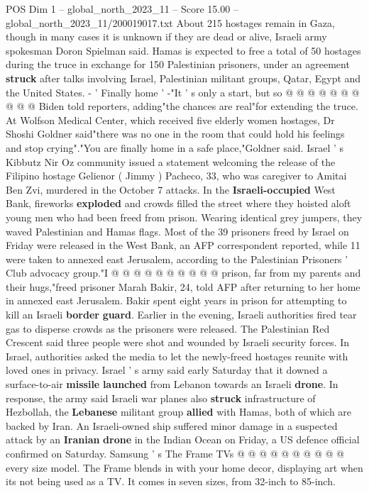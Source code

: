 \begin{textsample}{POS Dim 1 – global\_north\_2023\_11 – Score 15.00 – global\_north\_2023\_11/200019017.txt}
About 215 hostages remain in Gaza, though in many cases it is unknown if they are dead or alive, Israeli army spokesman Doron Spielman said.
Hamas is expected to free a total of 50 hostages during the truce in exchange for 150 Palestinian prisoners, under an agreement \textbf{struck} after talks involving Israel, Palestinian militant groups, Qatar, Egypt and the United States. - ' Finally home ' -"It ' s only a start, but so @ @ @ @ @ @ @ @ @ @ Biden told reporters, adding"the chances are real"for extending the truce.
At Wolfson Medical Center, which received five elderly women hostages, Dr Shoshi Goldner said"there was no one in the room that could hold his feelings and stop crying"."You are finally home in a safe place,"Goldner said.
Israel ' s Kibbutz Nir Oz community issued a statement welcoming the release of the Filipino hostage Gelienor ( Jimmy ) Pacheco, 33, who was caregiver to Amitai Ben Zvi, murdered in the October 7 attacks.
In the \textbf{Israeli-occupied} West Bank, fireworks \textbf{exploded} and crowds filled the street where they hoisted aloft young men who had been freed from prison.
Wearing identical grey jumpers, they waved Palestinian and Hamas flags.
Most of the 39 prisoners freed by Israel on Friday were released in the West Bank, an AFP correspondent reported, while 11 were taken to annexed east Jerusalem, according to the Palestinian Prisoners ' Club advocacy group."I @ @ @ @ @ @ @ @ @ @ prison, far from my parents and their hugs,"freed prisoner Marah Bakir, 24, told AFP after returning to her home in annexed east Jerusalem.
Bakir spent eight years in prison for attempting to kill an Israeli \textbf{border} \textbf{guard}.
Earlier in the evening, Israeli authorities fired tear gas to disperse crowds as the prisoners were released.
The Palestinian Red Crescent said three people were shot and wounded by Israeli security forces.
In Israel, authorities asked the media to let the newly-freed hostages reunite with loved ones in privacy.
Israel ' s army said early Saturday that it downed a surface-to-air \textbf{missile} \textbf{launched} from Lebanon towards an Israeli \textbf{drone}.
In response, the army said Israeli war planes also \textbf{struck} infrastructure of Hezbollah, the \textbf{Lebanese} militant group \textbf{allied} with Hamas, both of which are backed by Iran.
An Israeli-owned ship suffered minor damage in a suspected attack by an \textbf{Iranian} \textbf{drone} in the Indian Ocean on Friday, a US defence official confirmed on Saturday.
Samsung ' s The Frame TVs @ @ @ @ @ @ @ @ @ @ every size model.
The Frame blends in with your home decor, displaying art when its not being used as a TV.
It comes in seven sizes, from 32-inch to 85-inch.

\end{textsample}

